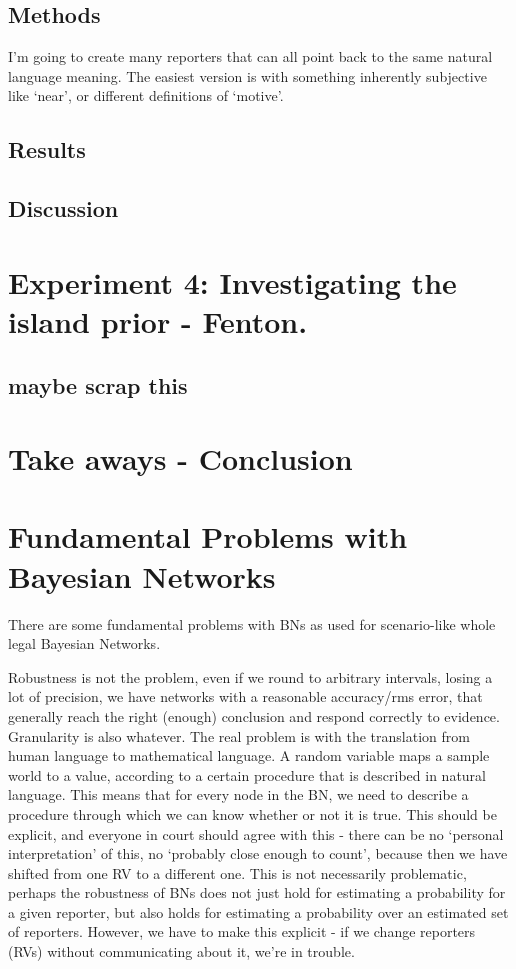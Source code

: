 \subsection{Methods}
I'm going to create many reporters that can all point back to the same natural language meaning. The easiest version is with something inherently subjective like `near', or different definitions of `motive'.

\subsection{Results}

\subsection{Discussion}



\section{Experiment 4: Investigating the island prior - Fenton.}
\subsection{maybe scrap this}
\section{Take aways - Conclusion}

\section{Fundamental Problems with Bayesian Networks}

There are some fundamental problems with BNs as used for scenario-like whole legal Bayesian Networks.

Robustness is not the problem, even if we round to arbitrary intervals, losing a lot of precision, we have networks with a reasonable accuracy/rms error, that generally reach the right (enough) conclusion and respond correctly to evidence. Granularity is also whatever. The real problem is with the translation from human language to mathematical language. A random variable maps a sample world to a value, according to a certain procedure that is described in natural language. This means that for every node in the BN, we need to describe a procedure through which we can know whether or not it is true. This should be explicit, and everyone in court should agree with this - there can be no `personal interpretation' of this, no `probably close enough to count', because then we have shifted from one RV to a different one. This is not necessarily problematic, perhaps the robustness of BNs does not just hold for estimating a probability for a given reporter, but also holds for estimating a probability over an estimated set of reporters. However, we have to make this explicit - if we change reporters (RVs) without communicating about it, we're in trouble. 

